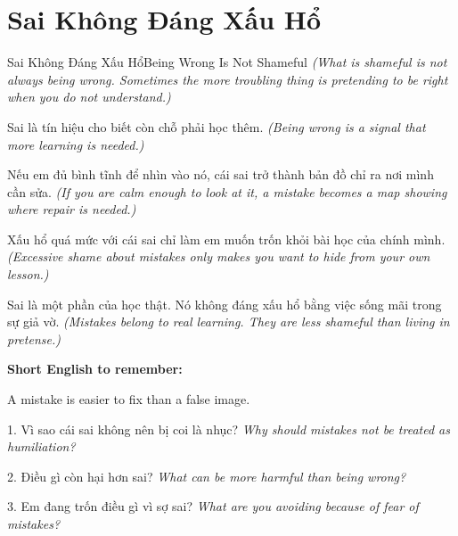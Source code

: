 \section{Sai Không Đáng Xấu Hổ}
\begin{truyen}{Sai Không Đáng Xấu Hổ}{Being Wrong Is Not Shameful}
\textit{(What is shameful is not always being wrong. Sometimes the more troubling thing is pretending to be right when you do not understand.)}

Sai là tín hiệu cho biết còn chỗ phải học thêm.
\textit{(Being wrong is a signal that more learning is needed.)}

Nếu em đủ bình tĩnh để nhìn vào nó, cái sai trở thành bản đồ chỉ ra nơi mình cần sửa.
\textit{(If you are calm enough to look at it, a mistake becomes a map showing where repair is needed.)}

Xấu hổ quá mức với cái sai chỉ làm em muốn trốn khỏi bài học của chính mình.
\textit{(Excessive shame about mistakes only makes you want to hide from your own lesson.)}
\end{truyen}

\begin{baihoc}
Sai là một phần của học thật. Nó không đáng xấu hổ bằng việc sống mãi trong sự giả vờ.
\textit{(Mistakes belong to real learning. They are less shameful than living in pretense.)}
\end{baihoc}

\begin{ghinhoanh}
\textbf{Short English to remember:}

A mistake is easier to fix than a false image.

\end{ghinhoanh}

\begin{tuhocnhanh}
1. Vì sao cái sai không nên bị coi là nhục? \textit{Why should mistakes not be treated as humiliation?}

2. Điều gì còn hại hơn sai? \textit{What can be more harmful than being wrong?}

3. Em đang trốn điều gì vì sợ sai? \textit{What are you avoiding because of fear of mistakes?}
\end{tuhocnhanh}
\ngancach

